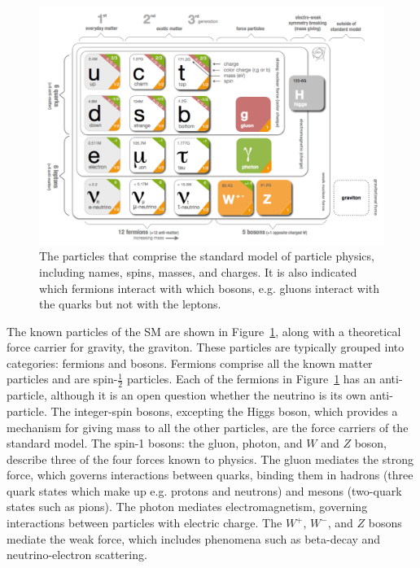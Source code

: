 \begin{figure}[htbp]
\begin{center}
\includegraphics[width=\textwidth]{figures/theory/sm.png}
\caption{The particles that comprise the standard model of particle physics, including names, spins, masses, and charges. It is also indicated which fermions interact with which bosons, e.g. gluons interact with the quarks but not with the leptons. }
\label{fig:sm}
\end{center}
\end{figure}


The known particles of the \ac{SM} are shown in Figure~\ref{fig:sm}, along with a theoretical force carrier for gravity, the graviton. These particles are typically grouped into categories: fermions and bosons. Fermions comprise all the known matter particles and are spin-$\frac{1}{2}$ particles. Each of the fermions in Figure~\ref{fig:sm} has an anti-particle, although it is an open question whether the neutrino is its own anti-particle. The integer-spin bosons, excepting the Higgs boson, which provides a mechanism for giving mass to all the other particles, are the force carriers of the standard model. The spin-1 bosons: the gluon, photon, and $W$ and $Z$ boson, describe three of the four forces known to physics. The gluon mediates the strong force, which governs interactions between quarks, binding them in hadrons (three quark states which make up e.g. protons and neutrons) and mesons (two-quark states such as pions). The photon mediates electromagnetism, governing interactions between particles with electric charge. The $W^{+}$, $W^{-}$, and $Z$ bosons mediate the weak force, which includes phenomena such as beta-decay and neutrino-electron scattering.

